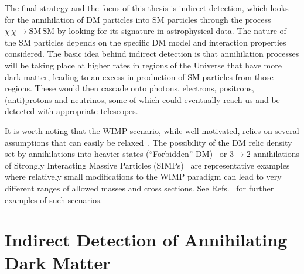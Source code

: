 The final strategy and the focus of this thesis is indirect detection, which looks for the annihilation of DM particles into SM particles through the process $\chi\,\chi\rightarrow\mathrm{SM}\,\mathrm{SM}$ by looking for its signature in astrophysical data. The nature of the SM particles depends on the specific DM model and interaction properties considered. The basic idea behind indirect detection is that annihilation processes will be taking place at higher rates in regions of the Universe that have more dark matter, leading to an excess in production of SM particles from those regions. These would then cascade onto photons, electrons, positrons, (anti)protons and neutrinos, some of which could eventually reach us and be detected with appropriate telescopes. %

It is worth noting that the WIMP scenario, while well-motivated, relies on several assumptions that can easily be relaxed~\cite{PhysRevD.43.3191}. The possibility of the DM relic density set by annihilations into heavier states (``Forbidden'' DM)~\cite{DAgnolo:2015ujb,PhysRevD.43.3191} or $3\rightarrow2$ annihilations of Strongly Interacting Massive Particles (SIMPs)~\cite{Hochberg:2014dra,Hochberg:2014kqa} are representative examples where relatively small modifications to the WIMP paradigm can lead to very different ranges of allowed masses and cross sections. See Refs.~\cite{Berlin:2016gtr,Berlin:2016vnh,Berlin:2017ftj,Bernal:2017mqb,Cline:2017tka,DAgnolo:2015nbz,DAgnolo:2017dbv,DEramo:2010keq,Dror:2016rxc,Farina:2016llk,Kopp:2016yji,Kuflik:2015isi,Pappadopulo:2016pkp,Pospelov:2007mp} for further examples of such scenarios.

\section{Indirect Detection of Annihilating Dark Matter}
\label{sec:astrodm}

